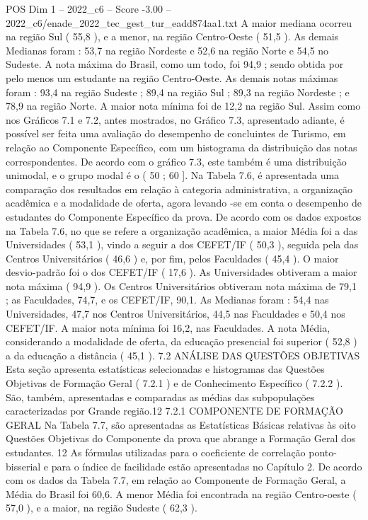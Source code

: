 \begin{textsample}{POS Dim 1 – 2022\_c6 – Score -3.00 – 2022\_c6/enade\_2022\_tec\_gest\_tur\_eadd874aa1.txt}
A maior mediana ocorreu na região Sul ( 55,8 ), e a menor, na região Centro-Oeste ( 51,5 ).
As demais Medianas foram : 53,7 na região Nordeste e 52,6 na região Norte e 54,5 no Sudeste.
A nota máxima do Brasil, como um todo, foi 94,9 ; sendo obtida por pelo menos um estudante na região Centro-Oeste.
As demais notas máximas foram : 93,4 na região Sudeste ; 89,4 na região Sul ; 89,3 na região Nordeste ; e 78,9 na região Norte.
A maior nota mínima foi de 12,2 na região Sul.
Assim como nos Gráficos 7.1 e 7.2, antes mostrados, no Gráfico 7.3, apresentado adiante, é possível ser feita uma avaliação do desempenho de concluintes de Turismo, em relação ao Componente Específico, com um histograma da distribuição das notas correspondentes.
De acordo com o gráfico 7.3, este também é uma distribuição unimodal, e o grupo modal é o ( 50 ; 60 ].
Na Tabela 7.6, é apresentada uma comparação dos resultados em relação à categoria administrativa, a organização acadêmica e a modalidade de oferta, agora levando -se em conta o desempenho de estudantes do Componente Específico da prova.
De acordo com os dados expostos na Tabela 7.6, no que se refere a organização acadêmica, a maior Média foi a das Universidades ( 53,1 ), vindo a seguir a dos CEFET/IF ( 50,3 ), seguida pela das Centros Universitários ( 46,6 ) e, por fim, pelos Faculdades ( 45,4 ).
O maior desvio-padrão foi o dos CEFET/IF ( 17,6 ).
As Universidades obtiveram a maior nota máxima ( 94,9 ).
Os Centros Universitários obtiveram nota máxima de 79,1 ; as Faculdades, 74,7, e os CEFET/IF, 90,1.
As Medianas foram : 54,4 nas Universidades, 47,7 nos Centros Universitários, 44,5 nas Faculdades e 50,4 nos CEFET/IF.
A maior nota mínima foi 16,2, nas Faculdades.
A nota Média, considerando a modalidade de oferta, da educação presencial foi superior ( 52,8 ) a da educação a distância ( 45,1 ). 7.2 ANÁLISE DAS QUESTÕES OBJETIVAS Esta seção apresenta estatísticas selecionadas e histogramas das Questões Objetivas de Formação Geral ( 7.2.1 ) e de Conhecimento Específico ( 7.2.2 ).
São, também, apresentadas e comparadas as médias das subpopulações caracterizadas por Grande região.12 7.2.1 COMPONENTE DE FORMAÇÃO GERAL Na Tabela 7.7, são apresentadas as Estatísticas Básicas relativas às oito Questões Objetivas do Componente da prova que abrange a Formação Geral dos estudantes. 12 As fórmulas utilizadas para o coeficiente de correlação ponto-bisserial e para o índice de facilidade estão apresentadas no Capítulo 2.
De acordo com os dados da Tabela 7.7, em relação ao Componente de Formação Geral, a Média do Brasil foi 60,6.
A menor Média foi encontrada na região Centro-oeste ( 57,0 ), e a maior, na região Sudeste ( 62,3 ).

\end{textsample}

